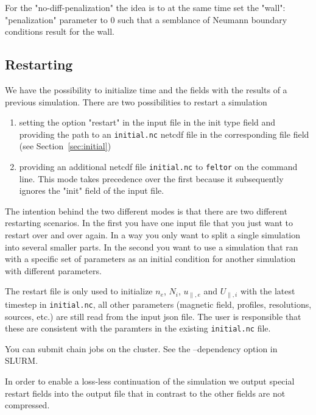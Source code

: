 For the "no-diff-penalization" the idea is to at the same time set
the "wall": "penalization" parameter to $0$ such that a semblance of
Neumann boundary conditions result for the wall.
\subsection{Restarting} \label{sec:restart}
We have the possibility to initialize time and
the fields with the results of a previous simulation.
There are two possibilities to restart a simulation
\begin{enumerate}
    \item setting the option "restart" in the input file in the init type field
        and providing the path to an \texttt{initial.nc} netcdf file in the
        corresponding file field (see Section~\ref{sec:initial})
    \item providing an additional netcdf file \texttt{initial.nc}
        to \texttt{feltor} on the
        command line. This mode takes precedence over the first because it
        subsequently ignores the "init" field of the input file.
\end{enumerate}
The intention behind the two different modes is that there are two different
restarting scenarios. In the first you have one input file that you just want
to restart over and over again. In a way you only want to split a single
simulation into several smaller parts. In the second you want to use a
simulation that ran with a specific set of parameters as an initial condition
for another simulation with different parameters.
\begin{tcolorbox}[title=Note]
    The restart file is only used to initialize $n_e$, $N_i$, $u_{\parallel,e}$
    and $U_{\parallel,i}$ with the latest timestep in \texttt{initial.nc}, all
    other parameters (magnetic field, profiles, resolutions, sources, etc.)
    are still read from the input json file.  The user is responsible
    that these are consistent with the paramters in the existing
    \texttt{initial.nc} file.
\end{tcolorbox}

\begin{tcolorbox}[title=Note]
    You can submit chain jobs on the cluster. See the --dependency option in SLURM.
\end{tcolorbox}
\begin{tcolorbox}[title=Note]
In order to enable a
loss-less continuation of the simulation we output special restart fields into
the output file that in contrast to the other fields are not compressed.
\end{tcolorbox}


